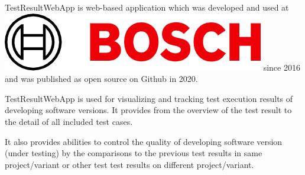 



TestResultWebApp is web-based application which was developed and used at 
\includegraphics[height=\fontcharht\font`\B]{./pictures/Bosch-Logo.png} since 2016 and was published
as open source on Github in 2020.

TestResultWebApp is used for visualizing and tracking test execution results of 
developing software versions. It provides from the overview of the test result
to the detail of all included test cases.

It also provides abilities to control the quality of developing software version 
(under testing) by the comparisons to the previous test results in same 
project/variant or other test test results on different project/variant.